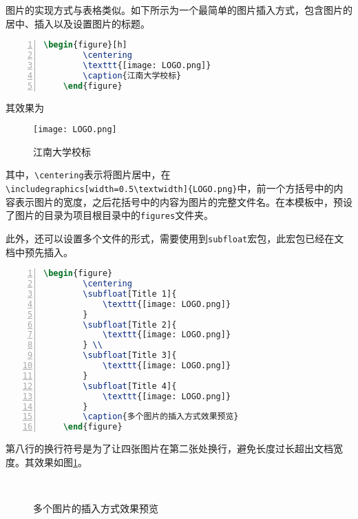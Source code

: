 图片的实现方式与表格类似。如下所示为一个最简单的图片插入方式，包含图片的居中、插入以及设置图片的标题。

\begin{lstlisting}[language=tex, breaklines=true, basicstyle=\ttfamily, numbers=left, numberstyle=\tiny, frame=shadowbox]
    \begin{figure}[h]
        \centering
        \texttt{[image: LOGO.png]}
        \caption{江南大学校标}
    \end{figure}
\end{lstlisting}

其效果为

\begin{figure}[h]
    \centering
    \texttt{[image: LOGO.png]}
    \caption{江南大学校标}
\end{figure}

其中，\texttt{\textbackslash centering}表示将图片居中，在\texttt{\textbackslash includegraphics[width=0.5\textbackslash textwidth]\{LOGO.png\}}中，前一个方括号中的内容表示图片的宽度，之后花括号中的内容为图片的完整文件名。在本模板中，预设了图片的目录为项目根目录中的\texttt{figures}文件夹。

此外，还可以设置多个文件的形式，需要使用到\texttt{subfloat}宏包，此宏包已经在文档中预先插入。

\begin{lstlisting}[language=tex, breaklines=true, basicstyle=\ttfamily, numbers=left, numberstyle=\tiny, frame=shadowbox]
    \begin{figure}
        \centering
        \subfloat[Title 1]{
            \texttt{[image: LOGO.png]}
        }
        \subfloat[Title 2]{
            \texttt{[image: LOGO.png]}
        } \\
        \subfloat[Title 3]{
            \texttt{[image: LOGO.png]}
        }
        \subfloat[Title 4]{
            \texttt{[image: LOGO.png]}
        }
        \caption{多个图片的插入方式效果预览}
    \end{figure}
\end{lstlisting}

第八行的换行符号是为了让四张图片在第二张处换行，避免长度过长超出文档宽度。其效果如图\ref{sty2}。

\begin{figure}[h]
    \centering
     \\
    \caption{多个图片的插入方式效果预览}
    \label{sty2}
\end{figure}

